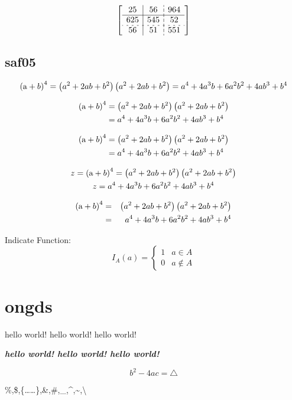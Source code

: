 \documentclass[twocolumn]{report}
\begin{document}
$$\left[\begin{array}{c|c;{4pt/2pt}c}
  25&56&964\\
  \hline
  625&545&52\\
  \hdashline[2pt/4pt]
  56&51&551
\end{array}\right]$$

\subsection{saf05}%

\[{\left( {{\rm{a}} + b} \right)^4} = \left( {{a^2} + 2ab + {b^2}} \right)\left( {{a^2} + 2ab + {b^2}} \right) = {a^4} + 4{a^3}b + 6{a^2}{b^2} + 4a{b^3} + {b^4}\]

\begin{equation}
  \begin{split}
  {\left( {{\rm{a}} + b} \right)^4} &= \left( {{a^2} + 2ab + {b^2}} \right)\left( {{a^2} + 2ab + {b^2}} \right)\\
  &={a^4} + 4{a^3}b + 6{a^2}{b^2} + 4a{b^3} + {b^4}
  \end{split}
\end{equation}

\begin{align}
  {\left( {{\rm{a}} + b} \right)^4} &= \left( {{a^2} + 2ab + {b^2}} \right)\left( {{a^2} + 2ab + {b^2}} \right)\nonumber\\
  &={a^4} + 4{a^3}b + 6{a^2}{b^2} + 4a{b^3} + {b^4}
\end{align}

\begin{equation}
\begin{gathered}
  z={\left( {{\rm{a}} + b} \right)^4}= \left( {{a^2} + 2ab + {b^2}} \right)\left( {{a^2} + 2ab + {b^2}} \right)\\
  z={a^4} + 4{a^3}b + 6{a^2}{b^2} + 4a{b^3} + {b^4}
\end{gathered}
\end{equation}

\begin{eqnarray}
  {\left( {{\rm{a}} + b} \right)^4} &=& \left( {{a^2} + 2ab + {b^2}} \right)\left( {{a^2} + 2ab + {b^2}} \right)\nonumber\\
  &=&{a^4} + 4{a^3}b + 6{a^2}{b^2} + 4a{b^3} + {b^4}
\end{eqnarray}

Indicate Function:
\[I_A(a)=\begin{cases}
  1&a\in A\\
  0&a\not\in A
  \end{cases}\]

\section{ongds}

hello world! hello world! hello world!

\textbf{\emph{hello world! hello world! hello world!}}

\emph{$$b^2-4ac=\triangle$$}

\%,\$,\{……\},\&,\#,\_,\^{},\~{},\textbackslash
\end{document}
